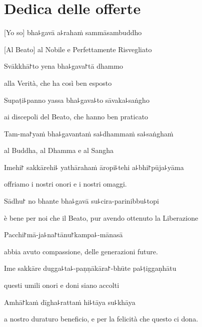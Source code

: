 \chapter{Dedica delle offerte}

[Yo so] bha꜕gavā a꜕rahaṁ sammāsambuddho

\begin{english}
[Al Beato] al Nobile e Perfettamente Risvegliato
\end{english}

Svākkhā꜓to yena bha꜕gava꜓tā dhammo

\begin{english}
alla Verità, che ha così ben esposto
\end{english}

Supaṭi꜕panno yassa bha꜕gava꜕to sāvaka꜕saṅgho

\begin{english}
ai discepoli del Beato, che hanno ben praticato
\end{english}

Tam-ma꜓yaṁ bha꜕gavantaṁ sa꜕dhammaṁ sa꜕saṅghaṁ

\begin{english}
al Buddha, al Dhamma e al Sangha
\end{english}

Imehi꜓ sakkārehi꜕ yathārahaṁ āropi꜕tehi a꜕bhi꜓pūja꜕yāma

\begin{english}
offriamo i nostri onori e i nostri omaggi.
\end{english}

Sādhu꜓ no bhante bha꜕gavā su꜕cira-parinibbu꜕topi

\begin{english}
è bene per noi che il Beato, pur avendo ottenuto la Liberazione
\end{english}

Pacchi꜓mā-ja꜕na꜓tānu꜓kampa꜕-mānasā

\begin{english}
abbia avuto compassione, delle generazioni future.
\end{english}

Ime sakkāre dugga꜕ta꜕-paṇṇākāra꜓-bhūte pa꜕ṭiggaṇhātu

\begin{english}
questi umili onori e doni siano accolti
\end{english}

Amhā꜓kaṁ dīgha꜕rattaṁ hi꜕tāya su꜕khāya

\begin{english}
a nostro duraturo beneficio, e per la felicità che questo ci dona.
\end{english}

